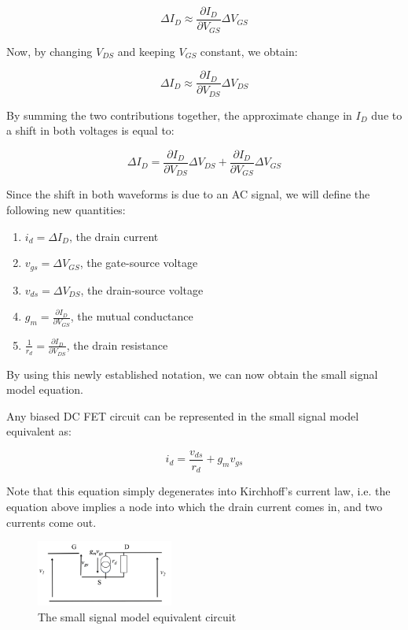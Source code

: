 \documentclass{article}
\begin{document}
\[ \Delta I_D \approx \frac{\partial I_D}{\partial V_{GS}} \Delta V_{GS} \]

Now, by changing $V_{DS}$ and keeping $V_{GS}$ constant, we obtain:

\[ \Delta I_D \approx \frac{\partial I_D}{\partial V_{DS}} \Delta V_{DS} \]

By summing the two contributions together, the approximate change in $I_D$ due to a shift in both voltages is equal to:

\[ \Delta I_D = \frac{\partial I_D}{\partial V_{DS}}\Delta V_{DS} + \frac{\partial I_D}{\partial V_{GS}} \Delta V_{GS} \]

Since the shift in both waveforms is due to an AC signal, we will define the following new quantities:

\begin{enumerate}
    \item $i_d = \Delta I_D$, the drain current
    \item $v_{gs} = \Delta V_{GS}$, the gate-source voltage
    \item $v_{ds} = \Delta V_{DS}$, the drain-source voltage
    \item $g_m = \frac{\partial I_D}{\partial V_{GS}}$, the mutual conductance
    \item $\frac{1}{r_d} = \frac{\partial I_D}{\partial V_{DS}}$, the drain resistance
\end{enumerate}

By using this newly established notation, we can now obtain the small signal model equation.

\begin{proposition}
    Any biased DC FET circuit can be represented in the small signal model equivalent as:

    \[ i_d = \frac{v_{ds}}{r_d} + g_mv_{gs} \]

    Note that this equation simply degenerates into Kirchhoff's current law, i.e. the equation above implies a node into which the drain current comes in, and two currents come out.
\end{proposition}

\begin{figure}[h]
    \centering
    \includegraphics[width = 0.4\textwidth]{images/ssm1.png}
    \caption{The small signal model equivalent circuit}
    \label{fig:ssm-1}
\end{figure}
\end{document}
